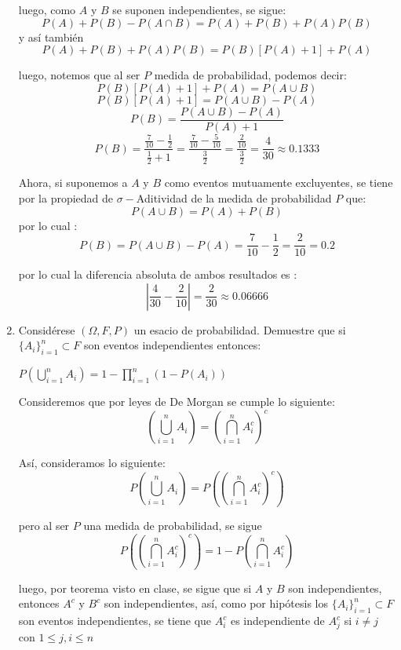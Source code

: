 \documentclass[12pt,a4paper]{report}
\begin{document}
\begin{enumerate}
{		luego, como $A$ y $B$ se suponen independientes, se sigue:
			$$ P(A) + P(B) - P(A \cap B) = P(A) + P(B) + P(A)P(B) $$
		y así también
			$$ P(A) + P(B) + P(A)P(B) = P(B)[P(A) + 1] + P(A)  $$

		luego, notemos que al ser $P$ medida de probabilidad, podemos decir:
			$$ P(B)[P(A) + 1] + P(A) = P(A \cup B) $$
			$$ P(B)[P(A) + 1] = P(A \cup B) - P(A)$$
			$$ P(B) = \frac{P(A \cup B) - P(A)}{P(A) + 1} $$
			$$ P(B) = \frac{ \frac{7}{10} - \frac{1}{2} }{ \frac{1}{2} + 1}
			        = \frac{ \frac{7}{10} - \frac{5}{10} }{ \frac{3}{2}}
					= \frac{ \frac{2}{10} }{ \frac{3}{2}}
					= \frac{ 4 }{ 30 } \approx 0.1333 $$

		Ahora, si suponemos a $A$ y $B$ como eventos mutuamente excluyentes, se
		tiene por la propiedad de $\sigma -$Aditividad de la medida de probabilidad
		$P$ que:
			$$ P(A \cup B) = P(A) + P(B) $$
		por lo cual :
			$$ P(B) = P(A \cup B) - P(A) = \frac{7}{10} - \frac{1}{2} = \frac{2}{10} = 0.2  $$

		por lo cual la diferencia absoluta de ambos resultados es :
			$$ | \frac{4}{30} - \frac{2}{10} | = \frac{2}{30} \approx 0.06666 $$
	}

   \item {
   Considérese $(\Omega,F, P)$ un esacio de probabilidad. Demuestre que si $\lbrace A_{i} \rbrace _{i=1}^{n} \subset F$ son eventos independientes entonces:
   \begin{center}
   		$P(\bigcup\limits_{i=1}^{n} A_{i})=1-\prod\limits_{i=1}^{n} (1-P(A_{i}))$
   \end{center}

   		Consideremos que por leyes de De Morgan se cumple lo siguiente:
			$$ \left(\bigcup_{i=1}^n A_i \right) = \left(\bigcap_{i = 1}^n A_i^c\right)^{c} $$

		Así, consideramos lo siguiente:
			$$ P\left(\bigcup_{i=1}^n A_i \right) = P\left(\left(\bigcap_{i = 1}^n A_i^c\right)^{c}\right) $$

		pero al ser $P$ una medida de probabilidad, se sigue
			$$ P\left(\left(\bigcap_{i = 1}^n A_i^c\right)^{c}\right) = 1 - P\left(\bigcap_{i = 1}^n A_i^c\right)$$

		luego, por teorema visto en clase, se sigue que si $A$ y $B$ son independientes,
		entonces $A^c$ y $B^c$ son independientes, así, como por hipótesis los
		$\lbrace A_{i} \rbrace _{i=1}^{n} \subset F$ son eventos independientes,
		se tiene que $ A_{i}^c $ es independiente de $ A_{j}^c $ si $i \neq j$
		con $ 1 \leq j, i \leq n $\\

}
\end{enumerate}
\end{document}
